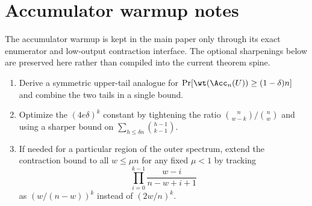 \section{Accumulator warmup notes}
\label{sec:exploration-accumulator-warmup-notes}

The accumulator warmup is kept in the main paper only through its exact enumerator and low-output contraction interface.
The optional sharpenings below are preserved here rather than compiled into the current theorem spine.

\begin{enumerate}
\item Derive a symmetric upper-tail analogue for \(\Pr[\wt(\Acc_n(U))\ge (1-\delta)n]\) and combine the two tails in a
single bound.
\item Optimize the \((4e\delta)^k\) constant by tightening the ratio
\(\binom{n}{w-k}/\binom{n}{w}\) and using a sharper bound on
\(\sum_{h\le \delta n}\binom{h-1}{k-1}\).
\item If needed for a particular region of the outer spectrum, extend the contraction bound to all \(w\le \mu n\) for any
fixed \(\mu<1\) by tracking
\[
\prod_{i=0}^{k-1}\frac{w-i}{n-w+i+1}
\]
as \((w/(n-w))^k\) instead of \((2w/n)^k\).
\end{enumerate}
